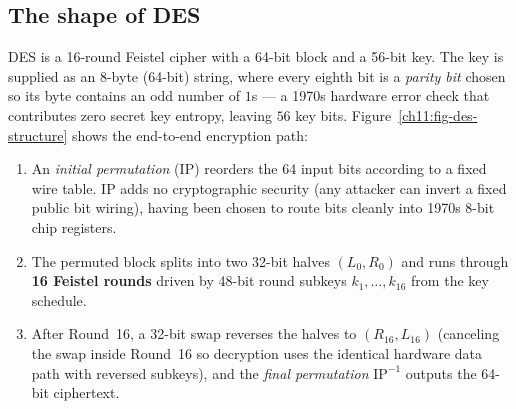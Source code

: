 \subsection{The shape of DES}

DES is a 16-round Feistel cipher with a 64-bit block and a 56-bit key. The key is supplied as an 8-byte (64-bit) string, where every eighth bit is a \emph{parity bit} chosen so its byte contains an odd number of $1$s --- a 1970s hardware error check that contributes zero secret key entropy, leaving $56$ key bits. Figure~\ref{ch11:fig-des-structure} shows the end-to-end encryption path:

\begin{enumerate}
  \item An \emph{initial permutation} ($\mathrm{IP}$) reorders the 64 input bits according to a fixed wire table. $\mathrm{IP}$ adds no cryptographic security (any attacker can invert a fixed public bit wiring), having been chosen to route bits cleanly into 1970s 8-bit chip registers.
  \item The permuted block splits into two 32-bit halves $(L_0, R_0)$ and runs through \textbf{16 Feistel rounds} driven by 48-bit round subkeys $k_1,\dots,k_{16}$ from the key schedule.
  \item After Round~16, a 32-bit swap reverses the halves to $(R_{16}, L_{16})$ (canceling the swap inside Round~16 so decryption uses the identical hardware data path with reversed subkeys), and the \emph{final permutation} $\mathrm{IP}^{-1}$ outputs the 64-bit ciphertext.
\end{enumerate}

